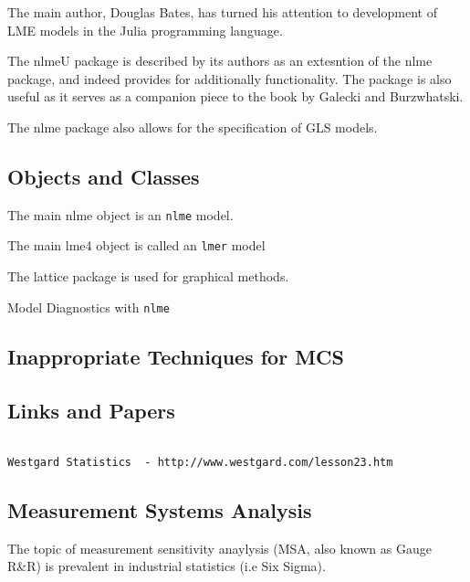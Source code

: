\documentclass[12pt, a4paper]{report}
\theoremstyle{plain}
\theoremstyle{definition}
\theoremstyle{remark}
\begin{document}
The main author, Douglas Bates, has turned his attention to development of LME models in the Julia programming language.

The nlmeU package is described by its authors as an extesntion of the nlme package, and indeed provides for additionally functionality. The package is also useful as it serves as a companion piece to the 
book by Galecki and Burzwhatski.

The nlme package also allows for the specification of GLS models.

\subsection*{Objects and Classes}

The main nlme object is an \texttt{nlme} model.

The main lme4 object is called an \texttt{lmer} model

The lattice package is used for graphical methods.


Model Diagnostics with \texttt{nlme}





\subsection{Inappropriate Techniques for MCS}


\subsection{Links and Papers}
\begin{verbatim}

Westgard Statistics  - http://www.westgard.com/lesson23.htm
\end{verbatim}





\subsection*{Measurement Systems Analysis}The topic of measurement sensitivity anaylysis (MSA, also known as Gauge R\&R) is prevalent in industrial statistics (i.e Six Sigma).
\end{document}
